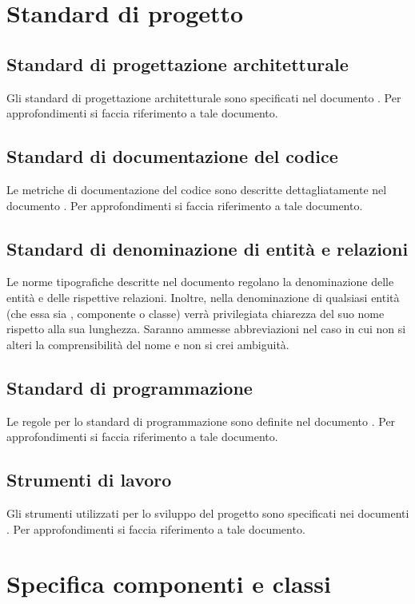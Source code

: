 \documentclass[a4paper, titlepage]{article}
\begin{document}
	\newpage
	
	\section{Standard di progetto}
	\subsection{Standard di progettazione architetturale}
	Gli standard di progettazione architetturale sono specificati nel documento . Per approfondimenti si faccia riferimento a tale documento.
	\subsection{Standard di documentazione del codice}
	Le metriche di documentazione del codice sono descritte dettagliatamente nel documento . Per approfondimenti si faccia riferimento a tale documento.
	\subsection{Standard di denominazione di entità e relazioni}
	Le norme tipografiche descritte nel documento  regolano la denominazione
	delle entità e delle rispettive relazioni. Inoltre, nella denominazione di qualsiasi entità (che essa sia
	, componente o classe) verrà privilegiata chiarezza del suo nome rispetto alla sua lunghezza.
	Saranno ammesse abbreviazioni nel caso in cui non si alteri la comprensibilità del nome e non si
	crei ambiguità.
	\subsection{Standard di programmazione}
	Le regole per lo standard di programmazione sono definite nel documento . Per approfondimenti si faccia riferimento a tale documento.
	\subsection{Strumenti di lavoro}
	Gli strumenti utilizzati per lo sviluppo del progetto sono specificati nei documenti . Per approfondimenti si faccia riferimento a tale documento.

\newpage
\section{Specifica componenti e classi}

\end{document}
